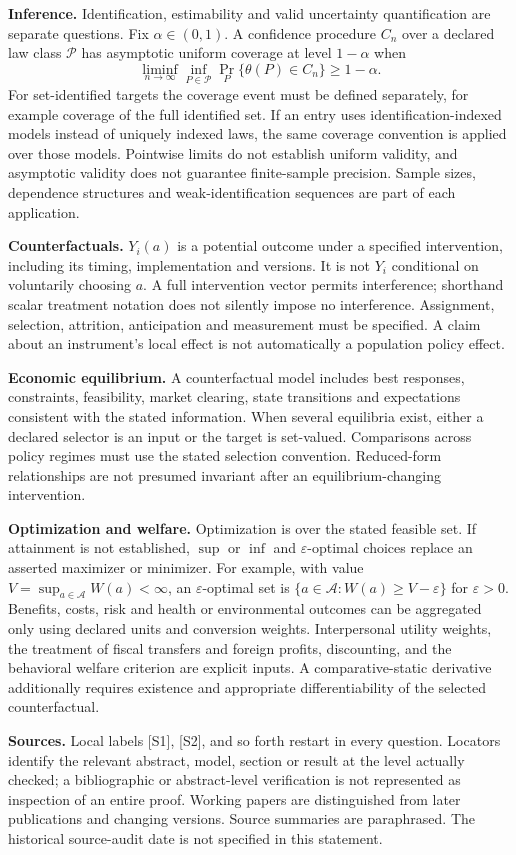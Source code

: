 \documentclass[11pt,a4paper]{article}
\begin{document}
\textbf{Inference.} Identification, estimability and valid uncertainty quantification are separate questions. Fix $\alpha\in(0,1)$. A confidence procedure $C_n$ over a declared law class $\mathcal P$ has asymptotic uniform coverage at level $1-\alpha$ when
\[
\liminf_{n\to\infty}\inf_{P\in\mathcal P}\Pr_P\{\theta(P)\in C_n\}\geq1-\alpha.
\]
For set-identified targets the coverage event must be defined separately, for example coverage of the full identified set. If an entry uses identification-indexed models instead of uniquely indexed laws, the same coverage convention is applied over those models. Pointwise limits do not establish uniform validity, and asymptotic validity does not guarantee finite-sample precision. Sample sizes, dependence structures and weak-identification sequences are part of each application.

\textbf{Counterfactuals.} $Y_i(a)$ is a potential outcome under a specified intervention, including its timing, implementation and versions. It is not $Y_i$ conditional on voluntarily choosing $a$. A full intervention vector permits interference; shorthand scalar treatment notation does not silently impose no interference. Assignment, selection, attrition, anticipation and measurement must be specified. A claim about an instrument's local effect is not automatically a population policy effect.

\textbf{Economic equilibrium.} A counterfactual model includes best responses, constraints, feasibility, market clearing, state transitions and expectations consistent with the stated information. When several equilibria exist, either a declared selector is an input or the target is set-valued. Comparisons across policy regimes must use the stated selection convention. Reduced-form relationships are not presumed invariant after an equilibrium-changing intervention.

\textbf{Optimization and welfare.} Optimization is over the stated feasible set. If attainment is not established, $\sup$ or $\inf$ and $\varepsilon$-optimal choices replace an asserted maximizer or minimizer. For example, with value $V=\sup_{a\in\mathcal A}W(a)<\infty$, an $\varepsilon$-optimal set is $\{a\in\mathcal A:W(a)\geq V-\varepsilon\}$ for $\varepsilon>0$. Benefits, costs, risk and health or environmental outcomes can be aggregated only using declared units and conversion weights. Interpersonal utility weights, the treatment of fiscal transfers and foreign profits, discounting, and the behavioral welfare criterion are explicit inputs. A comparative-static derivative additionally requires existence and appropriate differentiability of the selected counterfactual.

\textbf{Sources.} Local labels [S1], [S2], and so forth restart in every question. Locators identify the relevant abstract, model, section or result at the level actually checked; a bibliographic or abstract-level verification is not represented as inspection of an entire proof. Working papers are distinguished from later publications and changing versions. Source summaries are paraphrased. The historical source-audit date is not specified in this statement.
\end{document}
